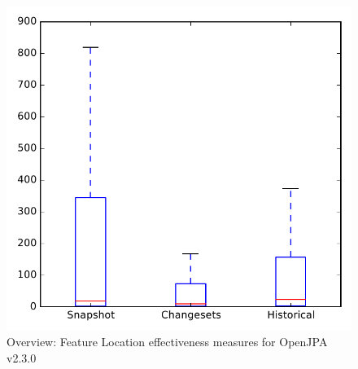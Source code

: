 
\begin{figure}
\centering
\includegraphics[height=0.4\textheight]{figures/flt/all_openjpa_no_outlier}
\caption{Overview: Feature Location effectiveness measures for OpenJPA v2.3.0}
\label{fig:flt:all:openjpa}
\end{figure}
